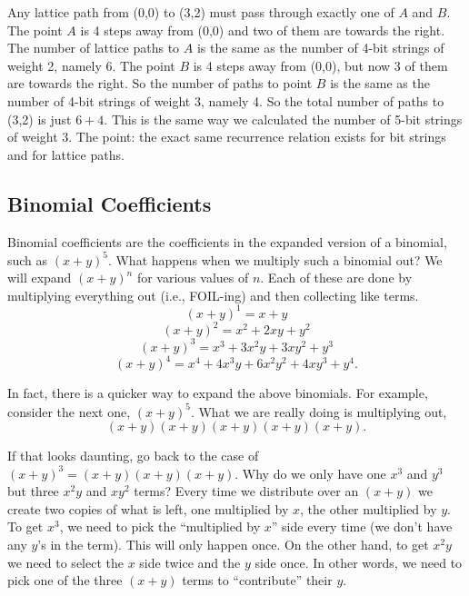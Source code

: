 \documentclass[10pt,]{book}
\theoremstyle{plain}
\theoremstyle{definition}
\theoremstyle{definition}
\theoremstyle{definition}
\numberwithin{equation}{chapter}
\begin{document}
        Any lattice path from (0,0) to (3,2) must pass through exactly one of \(A\) and \(B\). The point \(A\) is 4 steps away from (0,0) and two of them are towards the right. The number of lattice paths to \(A\) is the same as the number of 4-bit strings of weight 2, namely 6. The point \(B\) is 4 steps away from (0,0), but now 3 of them are towards the right. So the number of paths to point \(B\) is the same as the number of 4-bit strings of weight 3, namely 4. So the total number of paths to (3,2) is just \(6+4\). This is the same way we calculated the number of 5-bit strings of weight 3. The point: the exact same recurrence relation exists for bit strings and for lattice paths.
\typeout{************************************************}
\typeout{************************************************}
\subsection[Binomial Coefficients]{Binomial Coefficients}\label{subsection-15}

        Binomial coefficients are the coefficients in the expanded version of a binomial, such as \((x+y)^5\). What happens when we multiply such a binomial out? We will expand \((x+y)^n\) for various values of \(n\). Each of these are done by multiplying everything out (i.e., FOIL-ing) and then collecting like terms.
        \begin{equation*}
          (x+y)^1 = x + y
        \end{equation*}
\begin{equation*}
        (x+y)^2 = x^2 + 2xy + y^2
      \end{equation*}\begin{equation*}
        (x+y)^3 = x^3 + 3x^2y + 3xy^2 + y^3
      \end{equation*}\begin{equation*}
        (x+y)^4 = x^4 + 4x^3y + 6x^2y^2 + 4xy^3 + y^4.
      \end{equation*}\par

        In fact, there is a quicker way to expand the above binomials. For example, consider the next one, \((x+y)^5\). What we are really doing is multiplying out,
        \begin{equation*}
          (x+y)(x+y)(x+y)(x+y)(x+y).
        \end{equation*}
\par
If that looks daunting, go back to the case of \((x+y)^3 = (x+y)(x+y)(x+y)\). Why do we only have one \(x^3\) and \(y^3\) but three \(x^2y\) and \(xy^2\) terms? Every time we distribute over an \((x+y)\) we create two copies of what is left, one multiplied by \(x\), the other multiplied by \(y\). To get \(x^3\), we need to pick the ``multiplied by \(x\)'' side every time (we don't have any \(y\)'s in the term). This will only happen once. On the other hand, to get \(x^2y\) we need to select the \(x\) side twice and the \(y\) side once. In other words, we need to pick one of the three \((x+y)\) terms to ``contribute'' their \(y\).
\par
\end{document}
